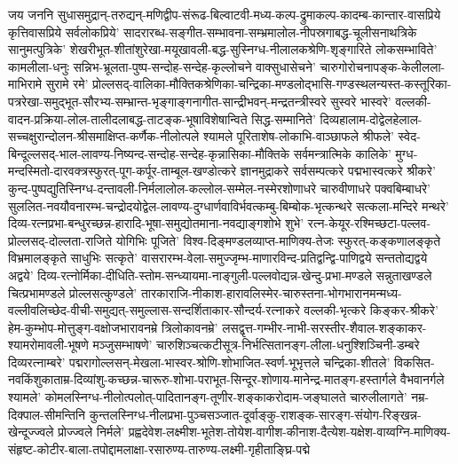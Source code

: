 \setlength{\emergencystretch}{3em}
जय जननि सुधासमुद्रान्-तरुद्यन्-मणिद्वीप-संरूढ-बिल्वाटवी-मध्य-कल्प-द्रुमाकल्प-कादम्ब-कान्तार-वासप्रिये कृत्तिवासप्रिये सर्वलोकप्रिये'
सादरारब्ध-सङ्गीत-सम्भावना-सम्भ्रमालोल-नीपस्रगाबद्ध-चूलीसनाथत्रिके सानुमत्पुत्रिके'
शेखरीभूत-शीतांशुरेखा-मयूखावली-बद्ध-सुस्निग्ध-नीलालकश्रेणि-शृङ्गारिते लोकसम्भाविते'
कामलीला-धनुः सन्निभ-भ्रूलता-पुष्प-सन्दोह-सन्देह-कृल्लोचने वाक्सुधासेचने'
चारुगोरोचनापङ्क-केलीलला-माभिरामे सुरामे रमे'
प्रोल्लसद्-वालिका-मौक्तिकश्रेणिका-चन्द्रिका-मण्डलोद्भासि-गण्डस्थलन्यस्त-कस्तूरिका-पत्ररेखा-समुद्भूत-सौरभ्य-सम्भ्रान्त-भृङ्गाङ्गनागीत-सान्द्रीभवन्-मन्द्रतन्त्रीस्वरे सुस्वरे भास्वरे'
वल्लकी-वादन-प्रक्रिया-लोल-तालीदलाबद्ध-ताटङ्क-भूषाविशेषान्विते सिद्ध-सम्मानिते'
दिव्यहालाम-दोद्वेलहेलाल-सच्चक्षुरान्दोलन-श्रीसमाक्षिप्त-कर्णैक-नीलोत्पले श्यामले पूरिताशेष-लोकाभि-वाञ्छाफले श्रीफले'
स्वेद-बिन्दूल्लसद्-भाल-लावण्य-निष्यन्द-सन्दोह-सन्देह-कृन्नासिका-मौक्तिके सर्वमन्त्रात्मिके कालिके'
मुग्ध-मन्दस्मितो-दारवक्त्रस्फुरत्-पूग-कर्पूर-ताम्बूल-खण्डोत्करे
ज्ञानमुद्राकरे सर्वसम्पत्करे
पद्मभास्वत्करे श्रीकरे'
कुन्द-पुष्पद्युतिस्निग्ध-दन्तावली-निर्मलालोल-कल्लोल-सम्मेल-नस्मेरशोणाधरे चारुवीणाधरे पक्वबिम्बाधरे'
सुललित-नवयौवनारम्भ-चन्द्रोदयोद्वेल-लावण्य-दुग्धार्णवाविर्भवत्कम्बु-बिम्बोक-भृत्कन्थरे सत्कला-मन्दिरे मन्थरे'
दिव्य-रत्नप्रभा-बन्धुरच्छन्न-हारादि-भूषा-समुद्योतमाना-नवद्याङ्गशोभे शुभे'
रत्न-केयूर-रश्मिच्छटा-पल्लव-प्रोल्लसद्-दोल्लता-राजिते योगिभिः पूजिते'
विश्व-दिङ्मण्डलव्याप्त-माणिक्य-तेजः स्फुरत्-कङ्कणालङ्कृते
विभ्रमालङ्कृते साधुभिः सत्कृते'
वासरारम्भ-वेला-समुज्जृम्भ-माणारविन्द-प्रतिद्वन्द्वि-पाणिद्वये
सन्ततोद्यद्वये अद्वये'
दिव्य-रत्नोर्मिका-दीधिति-स्तोम-सन्ध्यायमा-नाङ्गुली-पल्लवोद्यन्न-खेन्दु-प्रभा-मण्डले सन्नुताखण्डले
चित्प्रभामण्डले प्रोल्लसत्कुण्डले'
तारकाराजि-नीकाश-हारावलिस्मेर-चारुस्तना-भोगभारानमन्मध्य-वल्लीवलिच्छेद-वीची-समुद्यत्-समुल्लास-सन्दर्शिताकार-सौन्दर्य-रत्नाकरे वल्लकी-भृत्करे किङ्कर-श्रीकरे'
हेम-कुम्भोप-मोत्तुङ्ग-वक्षोजभारावनम्रे त्रिलोकावनम्रे'
लसद्वृत्त-गम्भीर-नाभी-सरस्तीर-शैवाल-शङ्काकर-श्यामरोमावली-भूषणे मञ्जुसम्भाषणे'
चारुशिञ्चत्कटीसूत्र-निर्भत्सितानङ्ग-लीला-धनुश्शिञ्चिनी-डम्बरे दिव्यरत्नाम्बरे'
पद्मरागोल्लसन्-मेखला-भास्वर-श्रोणि-शोभाजित-स्वर्ण-भूभृत्तले चन्द्रिका-शीतले'
विकसित-नवकिंशुकाताम्र-दिव्यांशु-कच्छन्न-चारूरु-शोभा-पराभूत-सिन्दूर-शोणाय-मानेन्द्र-मातङ्ग-हस्तार्गले वैभवानर्गले श्यामले'
कोमलस्निग्ध-नीलोत्पलोत्-पादितानङ्ग-तूणीर-शङ्काकरोदाम-जङ्घालते चारुलीलागते'
नम्र-दिक्पाल-सीमन्तिनि
कुन्तलस्निग्ध-नीलप्रभा-पुञ्चसञ्जात-दूर्वाङ्कु-राशङ्क-सारङ्ग-संयोग-रिङ्खन्न-खेन्दूज्ज्वले प्रोज्ज्वले निर्मले'
प्रह्वदेवेश-लक्ष्मीश-भूतेश-तोयेश-वागीश-कीनाश-दैत्येश-यक्षेश-वाय्वग्नि-माणिक्य-संहृष्ट-कोटीर-बाला-तपोद्दामलाक्षा-रसारुण्य-तारुण्य-लक्ष्मी-गृहीताङ्घ्रि-पद्मे
